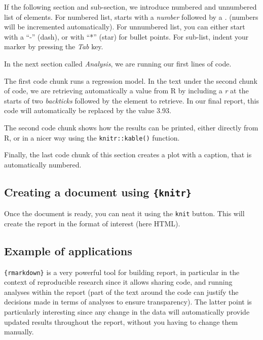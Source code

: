 \documentclass[
]{krantz}
\begin{document}
If the following section and sub-section, we introduce numbered and unnumbered list of elements. For numbered list, starts with a \emph{number} followed by a \emph{.} (numbers will be incremented automatically). For unnumbered list, you can either start with a ``-'' (dash), or with ``*'' (star) for bullet points. For sub-list, indent your marker by pressing the \emph{Tab} key.

In the next section called \emph{Analysis}, we are running our first lines of code.

The first code chunk runs a regression model. In the text under the second chunk of code, we are retrieving automatically a value from R by including a \emph{r} at the starts of two \emph{backticks} followed by the element to retrieve. In our final report, this code will automatically be replaced by the value 3.93.

The second code chunk shows how the results can be printed, either directly from R, or in a nicer way using the \texttt{knitr::kable()} function.

Finally, the last code chunk of this section creates a plot with a caption, that is automatically numbered.

\hypertarget{creating-a-document-using-knitr}{%
\subsection{\texorpdfstring{Creating a document using \texttt{\{knitr\}}}{Creating a document using \{knitr\}}}\label{creating-a-document-using-knitr}}

Once the document is ready, you can neat it using the \texttt{knit} button. This will create the report in the format of interest (here HTML).

\hypertarget{example-of-applications}{%
\subsection{Example of applications}\label{example-of-applications}}

\texttt{\{rmarkdown\}} is a very powerful tool for building report, in particular in the context of reproducible research since it allows sharing code, and running analyses within the report (part of the text around the code can justify the decisions made in terms of analyses to ensure transparency). The latter point is particularly interesting since any change in the data will automatically provide updated results throughout the report, without you having to change them manually.
\end{document}
